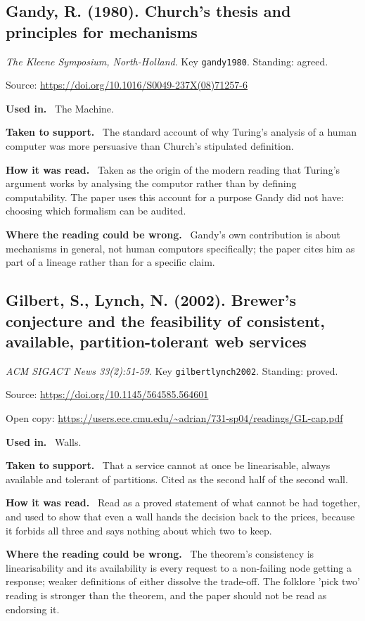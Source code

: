 \documentclass[11pt,oneside]{article}
\newcommand{\field}[1]{\par\noindent\textbf{\color{accent}#1.}\ }
\begin{document}
\subsection*{Gandy, R. (1980). Church's thesis and principles for mechanisms}
\noindent\small\emph{The Kleene Symposium, North-Holland}. Key \texttt{gandy1980}. Standing: agreed.
\par\noindent\small Source: \url{https://doi.org/10.1016/S0049-237X(08)71257-6}
\normalsize
\field{Used in} The Machine.
\field{Taken to support} The standard account of why Turing's analysis of a human computer was more persuasive than Church's stipulated definition.
\field{How it was read} Taken as the origin of the modern reading that Turing's argument works by analysing the computor rather than by defining computability. The paper uses this account for a purpose Gandy did not have: choosing which formalism can be audited.
\field{Where the reading could be wrong} Gandy's own contribution is about mechanisms in general, not human computors specifically; the paper cites him as part of a lineage rather than for a specific claim.

\hypertarget{src:gilbertlynch2002}{}
\subsection*{Gilbert, S., Lynch, N. (2002). Brewer's conjecture and the feasibility of consistent, available, partition-tolerant web services}
\noindent\small\emph{ACM SIGACT News 33(2):51-59}. Key \texttt{gilbertlynch2002}. Standing: proved.
\par\noindent\small Source: \url{https://doi.org/10.1145/564585.564601}
\par\noindent\small Open copy: \url{https://users.ece.cmu.edu/~adrian/731-sp04/readings/GL-cap.pdf}
\normalsize
\field{Used in} Walls.
\field{Taken to support} That a service cannot at once be linearisable, always available and tolerant of partitions. Cited as the second half of the second wall.
\field{How it was read} Read as a proved statement of what cannot be had together, and used to show that even a wall hands the decision back to the prices, because it forbids all three and says nothing about which two to keep.
\field{Where the reading could be wrong} The theorem's consistency is linearisability and its availability is every request to a non-failing node getting a response; weaker definitions of either dissolve the trade-off. The folklore 'pick two' reading is stronger than the theorem, and the paper should not be read as endorsing it.
\end{document}
